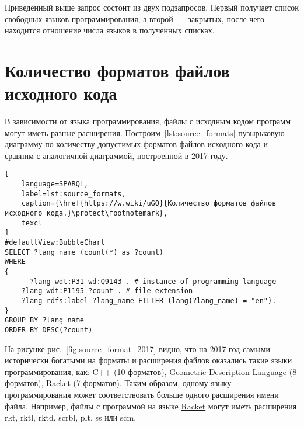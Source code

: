 Приведённый выше запрос состоит из двух подзапросов. Первый получает список свободных языков программирования, а второй~--- закрытых, после чего находится отношение числа языков в полученных списках.
\section{Количество форматов файлов исходного кода}
В зависимости от языка программирования, файлы с исходным кодом программ могут иметь разные расширения. Построим~\ref{lst:source_formats} пузырьковую диаграмму по количеству допустимых форматов файлов исходного кода и сравним с аналогичной диаграммой, построенной в 2017 году.

\begin{lstlisting}[
	language=SPARQL,
	label=lst:source_formats,
	caption={\href{https://w.wiki/uGQ}{Количество форматов файлов исходного кода.}\protect\footnotemark},
	texcl
]
#defaultView:BubbleChart
SELECT ?lang_name (count(*) as ?count)
WHERE
{
      ?lang wdt:P31 wd:Q9143 . # instance of programming language
 	?lang wdt:P1195 ?count . # file extension
 	?lang rdfs:label ?lang_name FILTER (lang(?lang_name) = "en").
}
GROUP BY ?lang_name 
ORDER BY DESC(?count)
\end{lstlisting}

На рисунке рис.~\ref{fig:source_format_2017} видно, что на 2017 год самыми исторически богатыми на форматы и расширения файлов оказались такие языки программирования, как: \href{https://en.wikipedia.org/wiki/C++}{C++} (10 форматов), \href{https://en.wikipedia.org/wiki/Geometric_Description_Language}{Geometric Description Language} (8 форматов), \href{https://en.wikipedia.org/wiki/Racket_(programming_language)}{Racket} (7 форматов). Таким образом, одному языку программирования может соответствовать больше одного расширения имени файла. Например, файлы с программой на языке \href{https://en.wikipedia.org/wiki/Racket_(programming_language)}{Racket} могут иметь расширения rkt, rktl, rktd, scrbl, plt, ss или scm.

